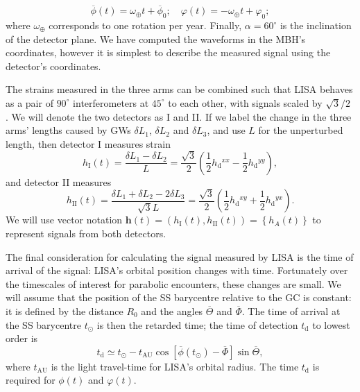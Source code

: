 \documentclass[useAMS,usedcolumn,usegraphicx,usenatbib]{mn2e}
\newcommand{\sub}[1]{\ensuremath{_\mathrm{#1}}}
\newcommand{\recip}[1]{\ensuremath{\frac{1}{#1}}}
\begin{document}
\begin{equation}
\overline{\phi}(t) = \omega_\oplus t + \overline{\phi}_0; \quad \varphi(t) = -\omega_\oplus t + \varphi_0;
\end{equation}
where $\omega_\oplus$ corresponds to one rotation per year. Finally, $\alpha = 60^{\circ}$ is the inclination of the detector plane. We have computed the waveforms in the MBH's coordinates, however it is simplest to describe the measured signal using the detector's coordinates.

The strains measured in the three arms can be combined such that LISA behaves as a pair of $90^{\circ}$ interferometers at $45^{\circ}$ to each other, with signals scaled by ${\sqrt{3}}/{2}$ \citep{Cutler1998}. We will denote the two detectors as I and II. If we label the change in the three arms' lengths caused by GWs $\delta L_1$, $\delta L_2$ and $\delta L_3$, and use $L$ for the unperturbed length, then detector I measures strain
\begin{equation}
h\sub{I}(t) = \frac{\delta L_1 - \delta L_2}{L} = \frac{\sqrt{3}}{2}\left(\recip{2} h\sub{d}^{xx} - \recip{2}h\sub{d}^{yy}\right),
\end{equation}
and detector II measures
\begin{equation}
h\sub{II}(t) = \frac{\delta L_1 + \delta L_2 - 2 \delta L_3}{\sqrt{3}L} = \frac{\sqrt{3}}{2}\left(\recip{2} h\sub{d}^{xy} + \recip{2} h\sub{d}^{yx}\right).
\end{equation}
We will use vector notation $\boldsymbol{h}(t) = \left(h\sub{I}(t), h\sub{II}(t)\right) = \left\{h_A(t)\right\}$ to represent signals from both detectors.

The final consideration for calculating the signal measured by LISA is the time of arrival of the signal: LISA's orbital position changes with time. Fortunately over the timescales of interest for parabolic encounters, these changes are small. We will assume that the position of the SS barycentre relative to the GC is constant: it is defined by the distance $R_0$ and the angles $\overline{\Theta}$ and $\overline{\Phi}$. The time of arrival at the SS barycentre $t_\odot$ is then the retarded time; the time of detection $t\sub{d}$ to lowest order is
\begin{equation}
t\sub{d} \simeq t_\odot - t\sub{AU}\cos\left[\overline{\phi}(t_\odot) - \overline{\Phi}\right]\sin\overline{\Theta},
\end{equation}
where $t\sub{AU}$ is the light travel-time for LISA's orbital radius. The time $t\sub{d}$ is required for $\phi(t)$ and $\varphi(t)$.
\end{document}
